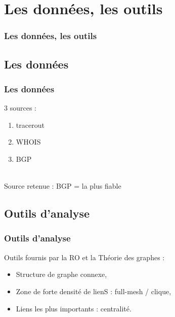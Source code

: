 \section{Les donn\'ees, les outils}

\begin{frame}
 	\frametitle{Les donn\'ees, les outils}
\end{frame}

\subsection{Les donn\'ees}
\frame
{
\frametitle{Les donn\'ees}
3 sources : \\
\begin{enumerate}
 \item tracerout
 \item WHOIS
 \item BGP
\end{enumerate}
~\\
Source retenue : BGP = la plus fiable
}

\subsection{Outils d'analyse}
\frame
{
\frametitle{Outils d'analyse}
Outils fournis par la RO et la Th\'eorie des graphes : \\
\begin{itemize}
 \item Structure de graphe connexe,
 \item Zone de forte densit\'e de lienS : full-mesh / clique,
 \item Liens les plus importants : centralit\'e.
\end{itemize}
}

